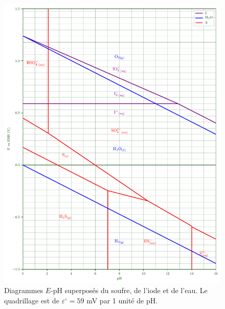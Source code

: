 \begin{solution}
    \begin{figure}[H]
        \centering
        \includegraphics[width = \linewidth]{chimiePC/gene/E-pH-S-sol.pdf}
        \caption{Diagrammes $E$-pH superposés du soufre, de l'iode et de l'eau. \protect\linebreak
        Le quadrillage est de $\varepsilon^\circ = 59$ mV par 1 unité de pH.}
        \label{fig:EpHS-sol}
    \end{figure}
    
\end{solution}